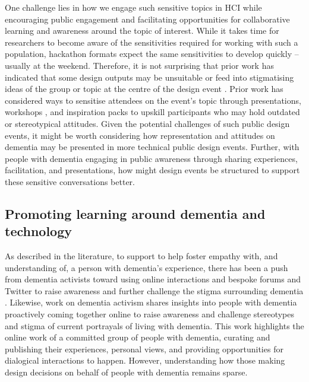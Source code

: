 One challenge lies in how we engage such sensitive topics in HCI while encouraging public engagement and facilitating opportunities for collaborative learning and awareness around the topic of interest. While it takes time for researchers to become aware of the sensitivities required for working with such a population, hackathon formats expect the same sensitivities to develop quickly – usually at the weekend. Therefore, it is not surprising that prior work has indicated that some design outputs may be unsuitable or feed into stigmatising ideas of the group or topic at the centre of the design event \citep{toros_co-creation_2020}. Prior work has considered ways to sensitise attendees on the event's topic through presentations, workshops \citep{hope_hackathons_2019}, and inspiration packs \citep{birbeck_self_2017} to upskill participants who may hold outdated or stereotypical attitudes. Given the potential challenges of such public design events, it might be worth considering how representation and attitudes on dementia may be presented in more technical public design events. Further, with people with dementia engaging in public awareness through sharing experiences, facilitation, and presentations, how might design events be structured to support these sensitive conversations better.


\subsection{Promoting learning around dementia and technology}
\label{BL:gap:Learning}
As described in the literature, to support to help foster empathy with, and understanding of, a person with dementia's experience, there has been a push from dementia activists toward using online interactions and bespoke forums and Twitter to raise awareness and further challenge the stigma surrounding dementia \citep{talbot_how_2020}. Likewise, \cite{lazar_safe_2019} work on dementia activism shares insights into people with dementia proactively coming together online to raise awareness and challenge stereotypes and stigma of current portrayals of living with dementia. This work highlights the online work of a committed group of people with dementia, curating and publishing their experiences, personal views, and providing opportunities for dialogical interactions to happen. However, understanding how those making design decisions on behalf of people with dementia remains sparse. 

